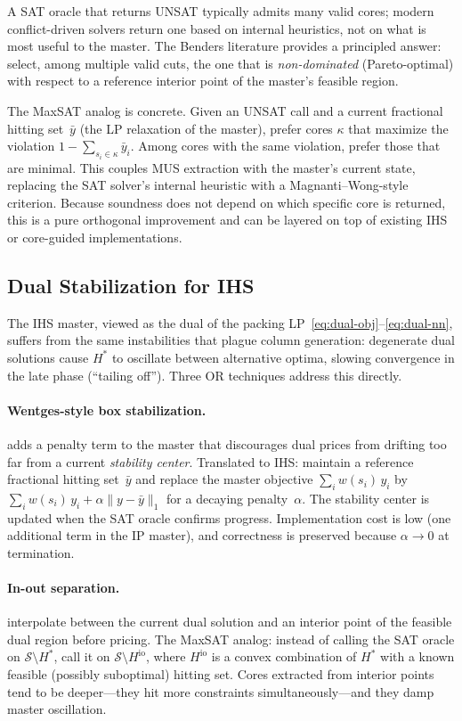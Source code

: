 \documentclass[11pt,a4paper]{article}
\begin{document}
A SAT oracle that returns UNSAT typically admits many valid cores; modern
conflict-driven solvers return one based on internal heuristics, not on what
is most useful to the master. The Benders literature provides a principled
answer: \citet{magnanti1981accelerating} select, among multiple valid cuts,
the one that is \emph{non-dominated} (Pareto-optimal) with respect to a
reference interior point of the master's feasible region.

The MaxSAT analog is concrete. Given an UNSAT call and a current fractional
hitting set~$\bar{y}$ (the LP relaxation of the master), prefer cores
$\kappa$ that maximize the violation $1 - \sum_{s_i \in \kappa} \bar{y}_i$.
Among cores with the same violation, prefer those that are minimal. This
couples MUS extraction with the master's current state, replacing the SAT
solver's internal heuristic with a Magnanti--Wong-style criterion. Because
soundness does not depend on which specific core is returned, this is a pure
orthogonal improvement and can be layered on top of existing IHS or
core-guided implementations.

\subsection{Dual Stabilization for IHS}

The IHS master, viewed as the dual of the packing
LP~\eqref{eq:dual-obj}--\eqref{eq:dual-nn}, suffers from the same instabilities
that plague column generation: degenerate dual solutions cause $H^*$ to
oscillate between alternative optima, slowing convergence in the late phase
(``tailing off''). Three OR techniques address this directly.

\paragraph{Wentges-style box stabilization.}
\citet{wentges1997weighted} adds a penalty term to the master that discourages
dual prices from drifting too far from a current \emph{stability center}.
Translated to IHS: maintain a reference fractional hitting set~$\bar{y}$ and
replace the master objective $\sum_i w(s_i)\, y_i$ by
$\sum_i w(s_i)\, y_i + \alpha \|y - \bar{y}\|_1$ for a decaying
penalty~$\alpha$. The stability center is updated when the SAT oracle
confirms progress. Implementation cost is low (one additional term in the IP
master), and correctness is preserved because $\alpha \to 0$ at termination.

\paragraph{In-out separation.}
\citet{benameur2007stabilization} interpolate between the current dual
solution and an interior point of the feasible dual region before pricing.
The MaxSAT analog: instead of calling the SAT oracle on $\mathcal{S}
\setminus H^*$, call it on $\mathcal{S} \setminus H^{\mathrm{io}}$, where
$H^{\mathrm{io}}$ is a convex combination of $H^*$ with a known feasible
(possibly suboptimal) hitting set. Cores extracted from interior points
tend to be deeper---they hit more constraints simultaneously---and they
damp master oscillation.
\end{document}
